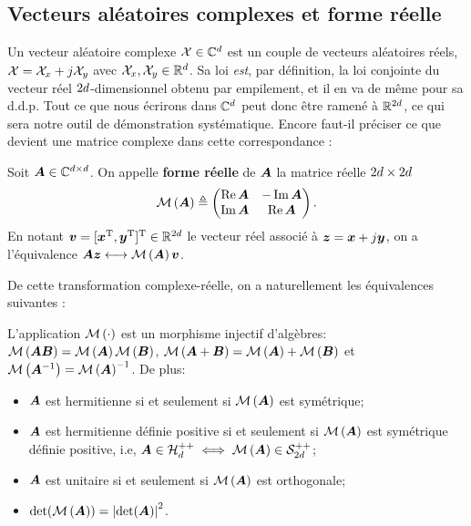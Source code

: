\subsection{Vecteurs aléatoires complexes et forme réelle}

Un vecteur aléatoire complexe $\mathcal{X}\in\mathbb{C}^d$ est un couple de vecteurs aléatoires réels, $\mathcal{X} = \mathcal{X}_x + j\mathcal{X}_y$ avec $\mathcal{X}_x,\mathcal{X}_y\in\mathbb{R}^d$. Sa loi \emph{est}, par définition, la loi conjointe du vecteur réel $2d$-dimensionnel obtenu par empilement, et il en va de même pour sa d.d.p. Tout ce que nous écrirons dans $\mathbb{C}^d$ peut donc être ramené à $\mathbb{R}^{2d}$, ce qui sera notre outil de démonstration systématique. Encore faut-il préciser ce que devient une matrice complexe dans cette correspondance :

\begin{definition}
\label{def:context-complex-form}
  Soit $\boldsymbol{A}\in\mathbb{C}^{d\times d}$. On appelle \textbf{forme réelle} de $\boldsymbol{A}$ la matrice réelle $2d\times2d$
\begin{equation}
  \mathcal{M}\left(\boldsymbol{A}\right)
  \triangleq
  \begin{pmatrix}
    \operatorname{\operatorname{Re}}\boldsymbol{A} & -\operatorname{\operatorname{Im}}\boldsymbol{A} \\
    \operatorname{\operatorname{Im}}\boldsymbol{A} & \operatorname{\operatorname{Re}}\boldsymbol{A}
  \end{pmatrix}.
  \label{eq:context-complex-form}
\end{equation}
   En notant $\boldsymbol{v}=[\boldsymbol{x}^{\mathrm{T}},\boldsymbol{y}^{\mathrm{T}}]^{\mathrm{T}}\in\mathbb{R}^{2d}$ le vecteur réel associé à $\boldsymbol{z}=\boldsymbol{x}+j\boldsymbol{y}$, on a l'équivalence $\boldsymbol{A}\boldsymbol{z} \longleftrightarrow \mathcal{M}\left(\boldsymbol{A}\right)\boldsymbol{v}$.
\end{definition}

De cette transformation complexe-réelle, on a naturellement les équivalences suivantes :

\begin{property}
\label{prop:context-complex-transport}
  L'application $\mathcal{M}\left(\cdot\right)$ est un morphisme injectif d'algèbres: $\mathcal{M}\left(\boldsymbol{A}\boldsymbol{B}\right) = \mathcal{M}\left(\boldsymbol{A}\right)\mathcal{M}\left(\boldsymbol{B}\right)$, $\mathcal{M}\left(\boldsymbol{A}+\boldsymbol{B}\right) = \mathcal{M}\left(\boldsymbol{A}\right)+\mathcal{M}\left(\boldsymbol{B}\right)$ et $\mathcal{M}\left({\boldsymbol{A}}^{-1}\right) = {\mathcal{M}\left(\boldsymbol{A}\right)}^{-1}$. De plus:
  \begin{itemize}
    \item $\boldsymbol{A}$ est hermitienne si et seulement si $\mathcal{M}\left(\boldsymbol{A}\right)$ est symétrique;
    \item $\boldsymbol{A}$ est hermitienne définie positive si et seulement si $\mathcal{M}\left(\boldsymbol{A}\right)$ est symétrique définie positive, i.e, $\boldsymbol{A}\in\mathcal{H}_{d}^{++}\iff\mathcal{M}\left(\boldsymbol{A}\right)\in\mathcal{S}_{2d}^{++}$;
    \item $\boldsymbol{A}$ est unitaire si et seulement si $\mathcal{M}\left(\boldsymbol{A}\right)$ est orthogonale;
    \item $\operatorname{\operatorname{det}}(\mathcal{M}\left(\boldsymbol{A}\right)) = \left\lvert\operatorname{\operatorname{det}}(\boldsymbol{A})\right\rvert^2$.
  \end{itemize}
\end{property}

